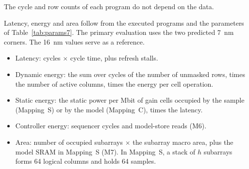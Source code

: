 The cycle and row counts of each program do not depend on the data.

Latency, energy and area follow from the executed programs and the parameters of Table~\ref{tab:params7}.
The primary evaluation uses the two predicted 7~nm corners. The 16~nm values serve as a reference.
\begin{itemize}
\item Latency: cycles $\times$ cycle time, plus refresh stalls.
\item Dynamic energy: the sum over cycles of the number of unmasked rows, times the number of active columns, times the energy per cell operation.
\item Static energy: the static power per Mbit of gain cells occupied by the sample (Mapping~S) or by the model (Mapping~C), times the latency.
\item Controller energy: sequencer cycles and model-store reads (M6).
\item Area: number of occupied subarrays $\times$ the subarray macro area, plus the model SRAM in Mapping~S (M7). In Mapping~S, a stack of $h$ subarrays forms 64 logical columns and holds 64 samples.
\end{itemize}
